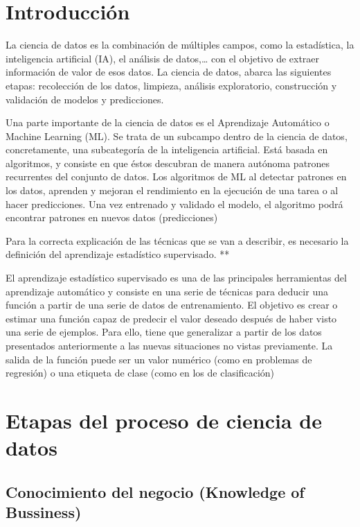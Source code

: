 \documentclass[12pt,a4paper,]{book}
\numberwithin{dummy}{section}
\theoremstyle{ocrenumbox}
\theoremstyle{blacknumex}
\theoremstyle{blacknumbox}
\theoremstyle{ocrenum}
\theoremstyle{ocrenum}
\begin{document}
\hypertarget{introducciuxf3n-1}{%
\section{Introducción}\label{introducciuxf3n-1}}

La ciencia de datos es la combinación de múltiples campos, como la
estadística, la inteligencia artificial (IA), el análisis de
datos,\ldots{} con el objetivo de extraer información de valor de esos
datos. La ciencia de datos, abarca las siguientes etapas: recolección de
los datos, limpieza, análisis exploratorio, construcción y validación de
modelos y predicciones.

Una parte importante de la ciencia de datos es el Aprendizaje Automático
o Machine Learning (ML). Se trata de un subcampo dentro de la ciencia de
datos, concretamente, una subcategoría de la inteligencia artificial.
Está basada en algoritmos, y consiste en que éstos descubran de manera
autónoma patrones recurrentes del conjunto de datos. Los algoritmos de
ML al detectar patrones en los datos, aprenden y mejoran el rendimiento
en la ejecución de una tarea o al hacer predicciones. Una vez entrenado
y validado el modelo, el algoritmo podrá encontrar patrones en nuevos
datos (predicciones)

Para la correcta explicación de las técnicas que se van a describir, es
necesario la definición del aprendizaje estadístico supervisado. **

El aprendizaje estadístico supervisado es una de las principales
herramientas del aprendizaje automático y consiste en una serie de
técnicas para deducir una función a partir de una serie de datos de
entrenamiento. El objetivo es crear o estimar una función capaz de
predecir el valor deseado después de haber visto una serie de ejemplos.
Para ello, tiene que generalizar a partir de los datos presentados
anteriormente a las nuevas situaciones no vistas previamente. La salida
de la función puede ser un valor numérico (como en problemas de
regresión) o una etiqueta de clase (como en los de clasificación)

\hypertarget{etapas-del-proceso-de-ciencia-de-datos}{%
\section{Etapas del proceso de ciencia de
datos}\label{etapas-del-proceso-de-ciencia-de-datos}}

\hypertarget{conocimiento-del-negocio-knowledge-of-bussiness}{%
\subsection{Conocimiento del negocio (Knowledge of
Bussiness)}\label{conocimiento-del-negocio-knowledge-of-bussiness}}
\end{document}

